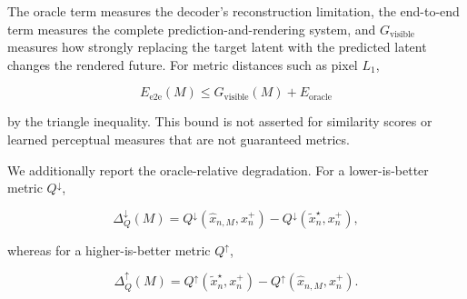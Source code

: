 The oracle term measures the decoder's reconstruction limitation, the
end-to-end term measures the complete prediction-and-rendering system,
and \(G_{\mathrm{visible}}\) measures how strongly replacing the
target latent with the predicted latent changes the rendered future.
For metric distances such as pixel \(L_1\),

\begin{equation*}
E_{\mathrm{e2e}}(M)
\le
G_{\mathrm{visible}}(M)
+
E_{\mathrm{oracle}}
\end{equation*}

by the triangle inequality. This bound is not asserted for similarity
scores or learned perceptual measures that are not guaranteed metrics.

We additionally report the oracle-relative degradation. For a
lower-is-better metric \(Q^\downarrow\),

\begin{equation*}
\Delta_Q^\downarrow(M)
=
Q^\downarrow(\widehat x_{n,M},x_n^+)
-
Q^\downarrow(\widetilde x_n^\star,x_n^+),
\end{equation*}

whereas for a higher-is-better metric \(Q^\uparrow\),

\begin{equation*}
\Delta_Q^\uparrow(M)
=
Q^\uparrow(\widetilde x_n^\star,x_n^+)
-
Q^\uparrow(\widehat x_{n,M},x_n^+).
\end{equation*}


